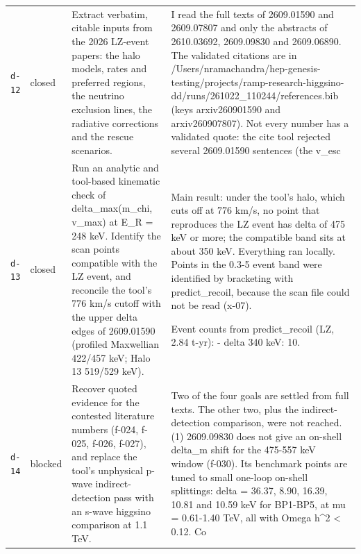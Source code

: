\documentclass[11pt,a4paper]{article}
\begin{document}
\begin{longtable}{@{}p{}p{}p{}p{}@{}}
\texttt{d-12} & closed & Extract verbatim, citable inputs from the 2026 LZ-event papers: the halo models, rates and preferred regions, the neutrino exclusion lines, the radiative corrections and the rescue scenarios. & I read the full texts of 2609.01590 and 2609.07807 and only the abstracts of 2610.03692, 2609.09830 and 2609.06890. The validated citations are in /Users/nramachandra/hep-genesis-testing/projects/ramp-research-higgsino-dd/runs/261022\_110244/references.bib (keys arxiv260901590 and arxiv260907807). Not every number has a validated quote: the cite tool rejected several 2609.01590 sentences (the v\_esc \\
\texttt{d-13} & closed & Run an analytic and tool-based kinematic check of delta\_max(m\_chi, v\_max) at E\_R = 248 keV. Identify the scan points compatible with the LZ event, and reconcile the tool's 776 km/s cutoff with the upper delta edges of 2609.01590 (profiled Maxwellian 422/457 keV; Halo 13 519/529 keV). & Main result: under the tool's halo, which cuts off at 776 km/s, no point that reproduces the LZ event has delta of 475 keV or more; the compatible band sits at about 350 keV. Everything ran locally. Points in the 0.3-5 event band were identified by bracketing with predict\_recoil, because the scan file could not be read (x-07).

Event counts from predict\_recoil (LZ, 2.84 t-yr):
- delta 340 keV: 10. \\
\texttt{d-14} & blocked & Recover quoted evidence for the contested literature numbers (f-024, f-025, f-026, f-027), and replace the tool's unphysical p-wave indirect-detection pass with an s-wave higgsino comparison at 1.1 TeV. & Two of the four goals are settled from full texts. The other two, plus the indirect-detection comparison, were not reached. (1) 2609.09830 does not give an on-shell delta\_m shift for the 475-557 keV window (f-030). Its benchmark points are tuned to small one-loop on-shell splittings: delta = 36.37, 8.90, 16.39, 10.81 and 10.59 keV for BP1-BP5, at \textbar{}mu\textbar{} = 0.61-1.40 TeV, all with Omega h\textasciicircum{}2 \textless{} 0.12. Co \\
\bottomrule\end{longtable}
\end{document}
